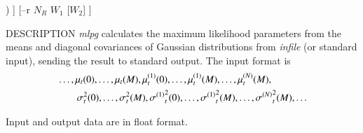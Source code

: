 \begin{synopsis}
	\item [mlpg] [ --l $L$ ] [ --m $M$ ] 
		[--d ($fn$ $|$ $d_0$ [$d_1$ $\dots$]) ]
		[--r $N_R$ $W_1$ [$W_2$] ]
	\item [\ ~~~~] [ --i $I$ ] [ --s $S$ ] [ {\em infile} ] 
\end{synopsis}

\begin{qsection}{DESCRIPTION}
	{\em mlpg} calculates the maximum likelihood parameters 
	from the means and diagonal covariances of Gaussian distributions 
	from {\em infile} (or standard input),
	sending the result to standard output.
	The input format is
 \begin{align}
	& \dots, \mu_t(0), \dots, \mu_t(M),
		\mu^{(1)}_t(0), \dots, \mu^{(1)}_t(M),
		\dots, \mu^{(N)}_t(M),
		\notag\\
	& \qquad \sigma^2_t(0), \dots, \sigma^2_t(M),
		{\sigma^{(1)}}^2_t(0), \dots, {\sigma^{(1)}}^2_t(M),
		\dots, {\sigma^{(N)}}^2_t(M),
		\dots \notag
 \end{align}

	Input and output data are in float format.


\end{qsection}

